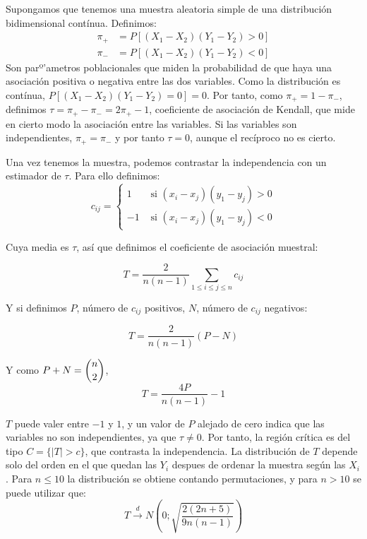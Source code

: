 
Supongamos que tenemos una muestra aleatoria simple de una distribuci\'on bidimensional cont\'inua. Definimos:
\begin{align*}
\pi_{+}&=P[(X_1-X_2)(Y_1-Y_2)>0] \\
\pi_{-}&=P[(X_1-X_2)(Y_1-Y_2)<0] 
\end{align*}
Son parº'ametros poblacionales que miden la probabilidad de que haya una asociaci\'on positiva o negativa entre las dos variables. Como la distribuci\'on es cont\'inua, $P[(X_1-X_2)(Y_1-Y_2)=0]=0$. Por tanto, como $\pi_+=1-\pi_-$, definimos $\tau=\pi_+-\pi_-=2\pi_+-1$, coeficiente de asociaci\'on de Kendall, que mide en cierto modo la asociaci\'on entre las variables. Si las variables son independientes, $\pi_+=\pi_-$ y por tanto $\tau=0$, aunque el rec\'iproco no es cierto.

Una vez tenemos la muestra, podemos contrastar la independencia con un estimador de $\tau$. Para ello definimos:
\[c_{ij}=\left\{\begin{matrix}
1 & \text{  si  } (x_i-x_j)(y_1-y_j)>0 \\
-1 & \text{  si  } (x_i-x_j)(y_1-y_j)<0 
\end{matrix}\right.\]

Cuya media es $\tau$, as\'i que definimos el coeficiente de asociaci\'on muestral:

\[T=\dfrac{2}{n(n-1)}\sum_{1\leq i\leq j\leq n}c_{ij}\]

Y si definimos $P$, n\'umero de $c_{ij}$ positivos, $N$, n\'umero de $c_{ij}$ negativos:

\[T=\dfrac{2}{n(n-1)}(P-N)\]

Y como $P+N=\dbinom{n}{2}$,
\[T=\dfrac{4P}{n(n-1)}-1\]

$T$ puede valer entre $-1$ y $1$, y un valor de $P$ alejado de cero indica que las variables no son independientes, ya que $\tau\neq0$. Por tanto, la regi\'on cr\'itica es del tipo $C=\{|T|>c\}$, que contrasta la independencia. La distribuci\'on de $T$ depende solo del orden en el que quedan las $Y_i$ despues de ordenar la muestra seg\'un las $X_i$. Para $n\leq10$ la distribuci\'on se obtiene contando permutaciones, y para $n>10$ se puede utilizar que:
\[T\overset{d}{\to}N\left(0;\sqrt{\dfrac{2(2n+5)}{9n(n-1)}}\right)\]



